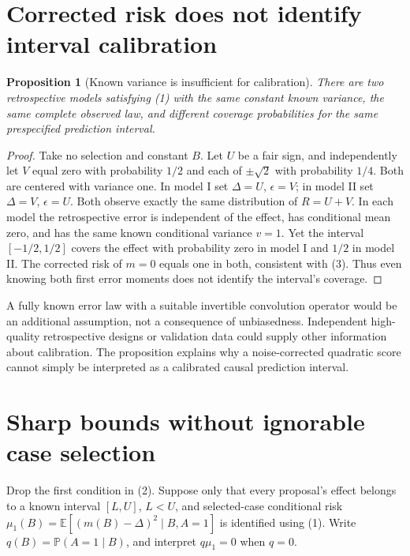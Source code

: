 \documentclass[11pt,a4paper]{article}
\newtheorem{proposition}[theorem]{Proposition}
\theoremstyle{remark}
\newcommand{\E}{\mathbb E}
\newcommand{\Prob}{\mathbb P}
\begin{document}
\section{Corrected risk does not identify interval calibration}
\begin{proposition}[Known variance is insufficient for calibration]
There are two retrospective models satisfying (1) with the same constant known variance, the same complete observed law, and different coverage probabilities for the same prespecified prediction interval.
\end{proposition}
\begin{proof}
Take no selection and constant $B$. Let $U$ be a fair sign, and independently let $V$ equal zero with probability $1/2$ and each of $\pm\sqrt2$ with probability $1/4$. Both are centered with variance one. In model I set $\Delta=U$, $\epsilon=V$; in model II set $\Delta=V$, $\epsilon=U$. Both observe exactly the same distribution of $R=U+V$. In each model the retrospective error is independent of the effect, has conditional mean zero, and has the same known conditional variance $v=1$. Yet the interval $[-1/2,1/2]$ covers the effect with probability zero in model I and $1/2$ in model II. The corrected risk of $m=0$ equals one in both, consistent with (3). Thus even knowing both first error moments does not identify the interval's coverage.
\end{proof}
A fully known error law with a suitable invertible convolution operator would be an additional assumption, not a consequence of unbiasedness. Independent high-quality retrospective designs or validation data could supply other information about calibration. The proposition explains why a noise-corrected quadratic score cannot simply be interpreted as a calibrated causal prediction interval.

\section{Sharp bounds without ignorable case selection}
Drop the first condition in (2). Suppose only that every proposal's effect belongs to a known interval $[L,U]$, $L<U$, and selected-case conditional risk
$\mu_1(B)=\E[(m(B)-\Delta)^2\mid B,A=1]$
is identified using (1). Write $q(B)=\Prob(A=1\mid B)$, and interpret $q\mu_1=0$ when $q=0$.
\end{document}
